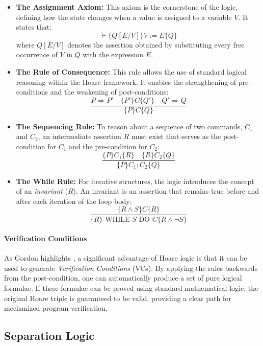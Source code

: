 \documentclass[sigconf]{acmart}
\begin{document}
\begin{itemize}
    \item \textbf{The Assignment Axiom:}
    This axiom is the cornerstone of the logic, defining how the state changes when a value is assigned to a variable $V$. It states that:
    \[
    \vdash \{Q[E/V]\} V := E \{Q\}
    \]
    where $Q[E/V]$ denotes the assertion obtained by substituting every free occurrence of $V$ in $Q$ with the expression $E$.

    \item \textbf{The Rule of Consequence:}
    This rule allows the use of standard logical reasoning within the Hoare framework. It enables the strengthening of pre-conditions and the weakening of post-conditions:
    \[
    \frac{P \Rightarrow P' \quad \{P'\} C \{Q'\} \quad Q' \Rightarrow Q}{\{P\} C \{Q\}}
    \]

    \item \textbf{The Sequencing Rule:}
    To reason about a sequence of two commands, $C_1$ and $C_2$, an intermediate assertion $R$ must exist that serves as the post-condition for $C_1$ and the pre-condition for $C_2$:
    \[
    \frac{\{P\} C_1 \{R\} \quad \{R\} C_2 \{Q\}}{\{P\} C_1; C_2 \{Q\}}
    \]

    \item \textbf{The While Rule:}
    For iterative structures, the logic introduces the concept of an \textit{invariant} ($R$). An invariant is an assertion that remains true before and after each iteration of the loop body:
    \[
    \frac{\{R \land S\} C \{R\}}{\{R\} \text{ WHILE } S \text{ DO } C \{R \land \neg S\}}
    \]
\end{itemize}

\paragraph{Verification Conditions}
As Gordon highlights \cite{gordon2014hoare}, a significant advantage of Hoare logic is that it can be used to generate \textit{Verification Conditions} (VCs). By applying the rules backwards from the post-condition, one can automatically produce a set of pure logical formulae. If these formulae can be proved using standard mathematical logic, the original Hoare triple is guaranteed to be valid, providing a clear path for mechanized program verification.


\subsection{Separation Logic}
\end{document}
